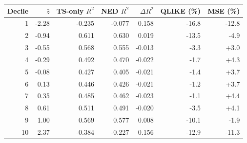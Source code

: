 \begin{tabular}{rrrrrrr}
\toprule
Decile & $\bar z$ & TS-only $R^2$ & NED $R^2$ & $\Delta R^2$ & QLIKE (\%) & MSE (\%) \\
\midrule
1 & -2.28 & -0.235 & -0.077 & 0.158 & -16.8 & -12.8 \\
2 & -0.94 & 0.611 & 0.630 & 0.019 & -13.5 & -4.9 \\
3 & -0.55 & 0.568 & 0.555 & -0.013 & -3.3 & +3.0 \\
4 & -0.29 & 0.492 & 0.470 & -0.022 & -1.7 & +4.3 \\
5 & -0.08 & 0.427 & 0.405 & -0.021 & -1.4 & +3.7 \\
6 & 0.13 & 0.446 & 0.426 & -0.021 & -1.2 & +3.7 \\
7 & 0.35 & 0.485 & 0.462 & -0.023 & -1.1 & +4.4 \\
8 & 0.61 & 0.511 & 0.491 & -0.020 & -3.5 & +4.1 \\
9 & 1.00 & 0.569 & 0.577 & 0.008 & -10.1 & -1.9 \\
10 & 2.37 & -0.384 & -0.227 & 0.156 & -12.9 & -11.3 \\
\bottomrule
\end{tabular}
